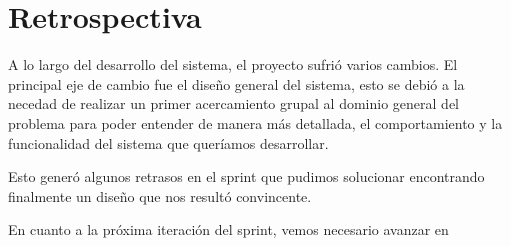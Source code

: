 \section{Retrospectiva}
A lo largo del desarrollo del sistema, el proyecto sufrió varios cambios. El principal eje de cambio fue el diseño general del sistema, esto se debió a la necedad de realizar un primer acercamiento grupal al dominio general del problema para poder entender de manera más detallada, el comportamiento y la funcionalidad del sistema que queríamos desarrollar.

Esto generó algunos retrasos en el sprint que pudimos solucionar encontrando finalmente un diseño que nos resultó convincente.

En cuanto a la próxima iteración del sprint, vemos necesario avanzar en